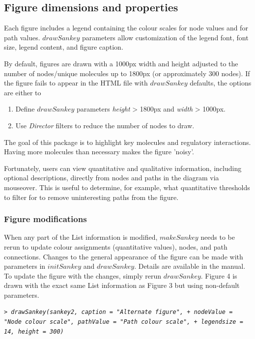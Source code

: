 \documentclass[a4paper]{article}
\begin{document}
    \subsection{Figure dimensions and properties}
Each figure includes a legend containing the colour scales for node values and for path values. $drawSankey$ parameters allow customization of the legend font, font size, legend content, and figure caption.

By default, figures are drawn with a 1000px width and height adjusted to the number of nodes/unique molecules up to 1800px (or approximately 300 nodes). If the figure fails to appear in the HTML file with $drawSankey$ defaults, the options are either to
\begin{enumerate}
    \item Define $drawSankey$ parameters \textit{height} > 1800px and \textit{width} > 1000px.
    \item Use \textit{Director} filters to reduce the number of nodes to draw.
\end{enumerate}

The goal of this package is to highlight key molecules and regulatory interactions. Having more molecules than necessary makes the figure 'noisy'.

Fortunately, users can view quantitative and qualitative information, including optional descriptions, directly from nodes and paths in the diagram via mouseover. This is useful to determine, for example, what quantitative thresholds to filter for to remove uninteresting paths from the figure.

    \subsubsection{Figure modifications}
    \label{sec:figMods}
When any part of the List information is modified, $makeSankey$ needs to be rerun to update colour assignments (quantitative values), nodes, and path connections. Changes to the general appearance of the figure can be made with parameters in $initSankey$ and $drawSankey$. Details are available in the manual. To update the figure with the changes, simply rerun $drawSankey$. Figure 4 is drawn with the exact same List information as Figure 3 but using non-default parameters.

\begin{Schunk}
\end{Schunk}
\textit{\texttt{> drawSankey(sankey2, caption = "Alternate figure",
+    nodeValue = "Node colour scale", pathValue = "Path colour scale",
+    legendsize = 14, height = 300)}}\\
\end{document}
